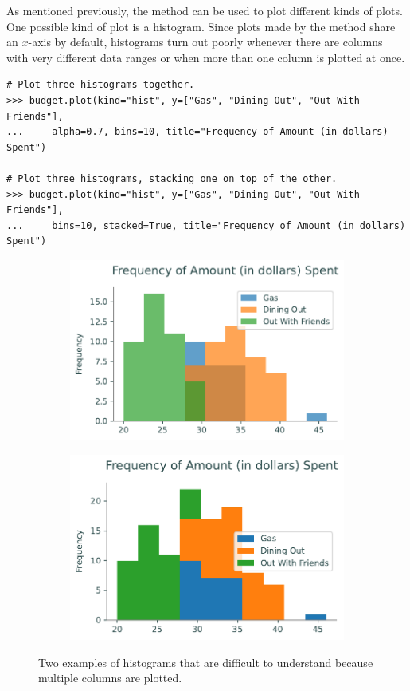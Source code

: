As mentioned previously, the  method can be used to plot different kinds of plots.
One possible kind of plot is a histogram.
Since plots made by the  method share an $x$-axis by default, histograms turn out poorly whenever there are columns with very different data ranges or when more than one column is plotted at once.

\begin{lstlisting}
# Plot three histograms together.
>>> budget.plot(kind="hist", y=["Gas", "Dining Out", "Out With Friends"],
... 	alpha=0.7, bins=10, title="Frequency of Amount (in dollars) Spent")

# Plot three histograms, stacking one on top of the other.
>>> budget.plot(kind="hist", y=["Gas", "Dining Out", "Out With Friends"],
...		bins=10, stacked=True, title="Frequency of Amount (in dollars) Spent")
\end{lstlisting}

\begin{figure}[H] %
\centering
\begin{subfigure}{.49\textwidth}
    \includegraphics[width=\textwidth]{figures/bad_hist_unstacked.pdf}
\end{subfigure}
%
\begin{subfigure}{.49\textwidth}
    \includegraphics[width=\textwidth]{figures/bad_hist_stacked.pdf}
\end{subfigure}
\caption{Two examples of histograms that are difficult to understand because multiple columns are plotted.}
\end{figure}

